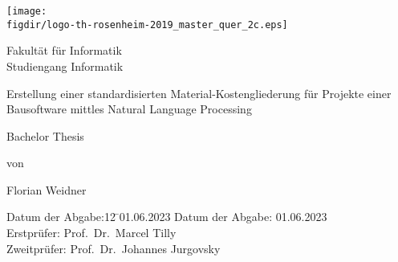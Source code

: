 \begin{titlepage}

\sffamily

\raggedleft

\vspace*{-2cm}

\texttt{[image: \\figdir/logo-th-rosenheim-2019\_master\_quer\_2c.eps]}

\vfill

\centering
\LARGE
Fakultät für Informatik  \vspace{0.5cm}\\
\Large
Studiengang Informatik

\vspace{2cm}

\LARGE

Erstellung einer standardisierten Material-Kostengliederung für Projekte einer Bausoftware mittles Natural Language Processing

\vspace{2cm}

\Large
Bachelor Thesis

\vspace{1.5cm}


\Large
von

\vspace{0.5cm}


\LARGE
Florian Weidner \vspace{1cm}

\vspace{1cm}

\flushleft
 \Large
\vspace*{\fill}

\begin{tabbing}
\normalsize Datum der Abgabe:12 \= \normalsize 01.06.2023 \kill
\normalsize Datum der Abgabe: \> \normalsize 01.06.2023 \\
\normalsize Erstprüfer: \> \normalsize Prof.\ Dr.\  Marcel Tilly \\
\normalsize Zweitprüfer: \> \normalsize Prof.\ Dr.\ Johannes Jurgovsky
\end{tabbing}

\end{titlepage}

\cleardoubleemptypage

